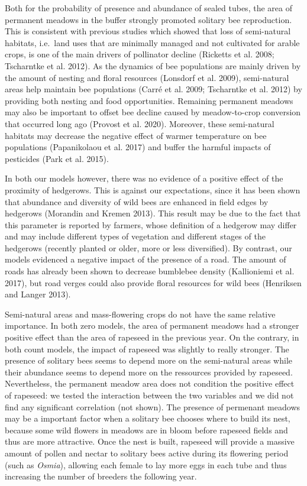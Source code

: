 \documentclass[smallextended]{svjour3}       %
\begin{document}
Both for the probability of presence and abundance of sealed tubes, the
area of permanent meadows in the buffer strongly promoted solitary bee
reproduction. This is consistent with previous studies which showed that
loss of semi-natural habitats, i.e.~land uses that are minimally managed
and not cultivated for arable crops, is one of the main drivers of
pollinator decline (Ricketts et al. 2008; Tscharntke et al. 2012). As
the dynamics of bee populations are mainly driven by the amount of
nesting and floral resources (Lonsdorf et al. 2009), semi-natural areas
help maintain bee populations (Carré et al. 2009; Tscharntke et al.
2012) by providing both nesting and food opportunities. Remaining
permanent meadows may also be important to offset bee decline caused by
meadow-to-crop conversion that occurred long ago (Provost et al. 2020).
Moreover, these semi-natural habitats may decrease the negative effect
of warmer temperature on bee populations (Papanikolaou et al. 2017) and
buffer the harmful impacts of pesticides (Park et al. 2015).

In both our models however, there was no evidence of a positive effect
of the proximity of hedgerows. This is against our expectations, since
it has been shown that abundance and diversity of wild bees are enhanced
in field edges by hedgerows (Morandin and Kremen 2013). This result may
be due to the fact that this parameter is reported by farmers, whose
definition of a hedgerow may differ and may include different types of
vegetation and different stages of the hedgerows (recently planted or
older, more or less diversified). By contrast, our models evidenced a
negative impact of the presence of a road. The amount of roads has
already been shown to decrease bumblebee density (Kallioniemi et al.
2017), but road verges could also provide floral resources for wild bees
(Henriksen and Langer 2013).

Semi-natural areas and mass-flowering crops do not have the same
relative importance. In both zero models, the area of permanent meadows
had a stronger positive effect than the area of rapeseed in the previous
year. On the contrary, in both count models, the impact of rapeseed was
slightly to really stronger. The presence of solitary bees seems to
depend more on the semi-natural areas while their abundance seems to
depend more on the ressources provided by rapeseed. Nevertheless, the
permanent meadow area does not condition the positive effect of
rapeseed: we tested the interaction between the two variables and we did
not find any significant correlation (not shown). The presence of
permenant meadows may be a important factor when a solitary bee chooses
where to build its nest, because some wild flowers in meadows are in
bloom before rapeseed fields and thus are more attractive. Once the nest
is built, rapeseed will provide a massive amount of pollen and nectar to
solitary bees active during its flowering period (such as \emph{Osmia}),
allowing each female to lay more eggs in each tube and thus increasing
the number of breeders the following year.
\end{document}
